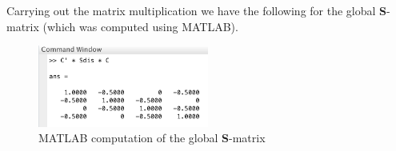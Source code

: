 \documentclass[11pt]{amsart}
\begin{document}
Carrying out the matrix multiplication we have the following for the global \textbf{S}-matrix (which was computed using MATLAB).

\begin{figure}[h]
    \includegraphics[width=0.5\textwidth]{assets/question_1_matlab.png}
    \caption{MATLAB computation of the global \textbf{S}-matrix}
    \label{fig:q1_matlab}
\end{figure}

\vspace{0.25in}
\begin{center}
\end{center}
\end{document}
